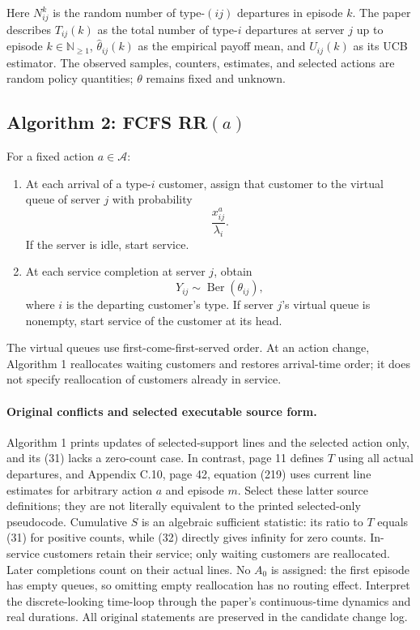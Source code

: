 \documentclass{article}
\begin{document}
Here $N^k_{ij}$ is the random number of type-$(ij)$ departures in episode $k$. The paper describes $T_{ij}(k)$ as the total number of type-$i$ departures at server $j$ up to episode $k\in\mathbb N_{\geq1}$, $\widehat\theta_{ij}(k)$ as the empirical payoff mean, and $U_{ij}(k)$ as its UCB estimator. The observed samples, counters, estimates, and selected actions are random policy quantities; $\theta$ remains fixed and unknown.

\subsection*{Algorithm 2: FCFS RR$(a)$}

For a fixed action $a\in\mathcal A$:
\begin{enumerate}
\item At each arrival of a type-$i$ customer, assign that customer to the virtual queue of server $j$ with probability
\[
\frac{x^a_{ij}}{\lambda_i}.
\]
If the server is idle, start service.
\item At each service completion at server $j$, obtain
\[
Y_{ij}\sim\operatorname{Ber}(\theta_{ij}),
\]
where $i$ is the departing customer's type. If server $j$'s virtual queue is nonempty, start service of the customer at its head.
\end{enumerate}
The virtual queues use first-come-first-served order. At an action change, Algorithm 1 reallocates waiting customers and restores arrival-time order; it does not specify reallocation of customers already in service.

\paragraph{Original conflicts and selected executable source form.}
Algorithm 1 prints updates of selected-support lines and the selected action
only, and its (31) lacks a zero-count case. In contrast, page 11 defines $T$
using all actual departures, and Appendix C.10, page 42, equation (219) uses
current line estimates for arbitrary action $a$ and episode $m$. Select these
latter source definitions; they are not literally equivalent to the printed
selected-only pseudocode. Cumulative $S$ is an algebraic sufficient statistic:
its ratio to $T$ equals (31) for positive counts, while (32) directly gives
infinity for zero counts. In-service customers retain their service; only
waiting customers are reallocated. Later completions count on their actual
lines. No $A_0$ is assigned: the first episode has empty queues, so omitting
empty reallocation has no routing effect. Interpret the discrete-looking
time-loop through the paper's continuous-time dynamics and real durations.
All original statements are preserved in the candidate change log.
\end{document}
